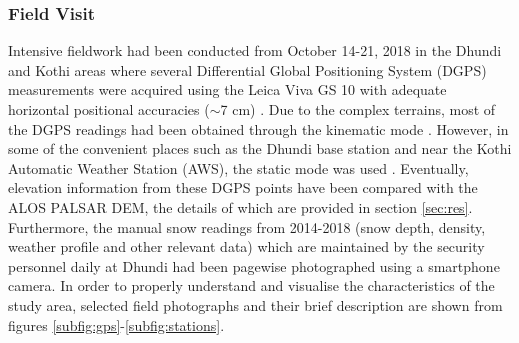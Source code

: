 \documentclass[review]{elsarticle}
\numberwithin{equation}{section}
\numberwithin{figure}{section}
\numberwithin{table}{section}
\begin{document}
\subsubsection{Field Visit}
\label{sssec:field}
Intensive fieldwork had been conducted from October 14-21, 2018 in the Dhundi and Kothi areas where several Differential Global Positioning System (DGPS) measurements were acquired using the Leica Viva GS 10 \citep{LeicaGeosystemsAG2012} with adequate horizontal positional accuracies ($\sim$7 cm) \citep{Majumdar2019}. Due to the complex terrains, most of the DGPS readings had been obtained through the kinematic mode \citep{Luo2014}. However, in some of the convenient places such as the Dhundi base station and near the Kothi Automatic Weather Station (AWS), the static mode was used \citep{LeicaGeosystemsAG2012}. Eventually, elevation information from these DGPS points have been compared with the ALOS PALSAR DEM, the details of which are provided in section \ref{sec:res}. Furthermore, the manual snow readings from 2014-2018 (snow depth, density, weather profile and other relevant data) which are maintained by the security personnel daily at Dhundi had been pagewise photographed using a smartphone camera. In order to properly understand and visualise the characteristics of the study area, selected field photographs and their brief description are shown from figures \ref{subfig:gps}-\ref{subfig:stations}.
\end{document}
